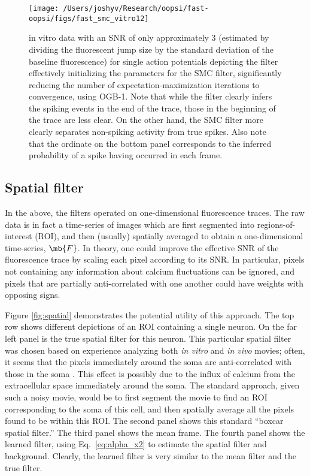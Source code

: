\begin{figure}[h!]
\centering \texttt{[image: /Users/joshyv/Research/oopsi/fast-oopsi/figs/fast\_smc\_vitro12]}
\caption[\foopsi filter can initialize Wiener filter]{in vitro data with an SNR of only approximately 3 (estimated by dividing the fluorescent jump size by the standard deviation of the baseline fluorescence) for single action potentials depicting the \foopsi filter effectively initializing the parameters for the SMC filter, significantly reducing the number of expectation-maximization iterations to convergence, using OGB-1.  Note that while the \foopsi filter clearly infers the spiking events in the end of the trace, those in the beginning of the trace are less clear.  On the other hand, the SMC filter more clearly separates non-spiking activity from true spikes.  Also note that the ordinate on the bottom panel corresponds to the inferred probability of a spike having occurred in each frame.} \label{fig:smc_init}
\end{figure}

\subsection{Spatial filter} \label{sec:results:spatial}

In the above, the filters operated on one-dimensional fluorescence traces. The raw data is in fact a time-series of images which are first segmented into regions-of-interest (ROI), and then (usually) spatially averaged to obtain a one-dimensional time-series, $\mb{F}$.  In theory, one could improve the effective SNR of the fluorescence trace by scaling each pixel according to its SNR.  In particular, pixels not containing any information about calcium fluctuations can be ignored, and pixels that are partially anti-correlated with one another could have weights with opposing signs.  

Figure \ref{fig:spatial} demonstrates the potential utility of this approach.  The top row shows different depictions of an ROI containing a single neuron.  On the far left panel is the true spatial filter for this neuron.  This particular spatial filter was chosen based on experience analyzing both \emph{in vitro} and \emph{in vivo} movies; often, it seems that the pixels immediately around the soma are anti-correlated with those in the soma \cite{MacLeanYuste05,WatsonYuste08}.  This effect is possibly due to the influx of calcium from the extracellular space immediately around the soma.   The standard approach, given such a noisy movie, would be to first segment the movie to find an ROI corresponding to the soma of this cell, and then spatially average all the pixels found to be within this ROI.  The second panel shows this standard ``boxcar spatial filter.''  The third panel shows the mean frame. The fourth panel shows the learned filter, using Eq.~\eqref{eq:alpha_x2} to estimate the spatial filter and background. Clearly, the learned filter is very similar to the mean filter and the true filter. 

